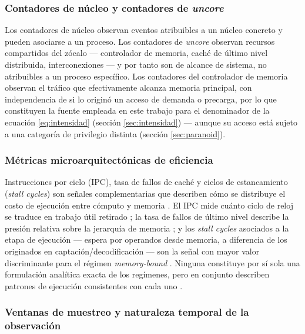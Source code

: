 \documentclass[12pt,oneside,spanish]{book}
\begin{document}
\subsubsection{Contadores de núcleo y contadores de \textit{uncore}}
\label{sec:uncore}

Los contadores de núcleo observan eventos atribuibles a un núcleo concreto y pueden asociarse a un proceso. Los contadores de \textit{uncore} observan recursos compartidos del zócalo --- controlador de memoria, caché de último nivel distribuida, interconexiones --- y por tanto son de alcance de sistema, no atribuibles a un proceso específico. Los contadores del controlador de memoria observan el tráfico que efectivamente alcanza memoria principal, con independencia de si lo originó un acceso de demanda o precarga, por lo que constituyen la fuente empleada en este trabajo para el denominador de la ecuación \eqref{eq:intensidad} (sección \ref{sec:intensidad}) --- aunque su acceso está sujeto a una categoría de privilegio distinta (sección \ref{sec:paranoid}).

\subsubsection{Métricas microarquitectónicas de eficiencia}

Instrucciones por ciclo (IPC), tasa de fallos de caché y ciclos de estancamiento (\textit{stall cycles}) son señales complementarias que describen cómo se distribuye el costo de ejecución entre cómputo y memoria \cite{Shekofteh2019,Littman2025}. El IPC mide cuánto ciclo de reloj se traduce en trabajo útil retirado \cite[Ch.~6]{Gregg2020}; la tasa de fallos de último nivel describe la presión relativa sobre la jerarquía de memoria \cite[Ch.~2]{Gregg2020}; y los \textit{stall cycles} asociados a la etapa de ejecución --- espera por operandos desde memoria, a diferencia de los originados en captación/decodificación --- son la señal con mayor valor discriminante para el régimen \textit{memory-bound} \cite[Ch.~6]{Gregg2020}. Ninguna constituye por sí sola una formulación analítica exacta de los regímenes, pero en conjunto describen patrones de ejecución consistentes con cada uno \cite{Littman2025}.

\subsubsection{Ventanas de muestreo y naturaleza temporal de la observación}
\label{sec:ventanas}
\end{document}

